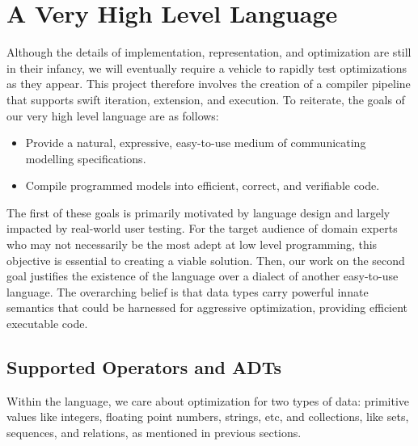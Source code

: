 \documentclass{article}
\begin{document}







\section{A Very High Level Language}

Although the details of implementation, representation, and optimization are still in their infancy, we will eventually require a vehicle to rapidly test optimizations as they appear. This project therefore involves the creation of a compiler pipeline that supports swift iteration, extension, and execution. To reiterate, the goals of our very high level language are as follows:
\begin{itemize}
  \item Provide a natural, expressive, easy-to-use medium of communicating modelling specifications.
  \item Compile programmed models into efficient, correct, and verifiable code.
\end{itemize}
The first of these goals is primarily motivated by language design and largely impacted by real-world user testing. For the target audience of domain experts who may not necessarily be the most adept at low level programming, this objective is essential to creating a viable solution. Then, our work on the second goal justifies the existence of the language over a dialect of another easy-to-use language. The overarching belief is that data types carry powerful innate semantics that could be harnessed for aggressive optimization, providing efficient executable code.

\subsection{Supported Operators and ADTs}
Within the language, we care about optimization for two types of data: primitive values like integers, floating point numbers, strings, etc, and collections, like sets, sequences, and relations, as mentioned in previous sections.
\end{document}
